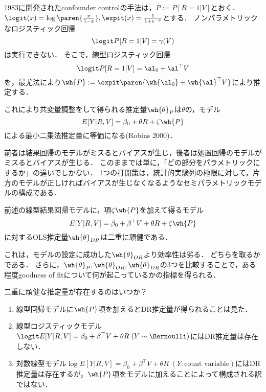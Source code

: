 \documentclass[uplatex,dvipdfmx]{jsreport}
\begin{document}
\begin{example}
    1983に開発されたconfounder controlの手法は，$P:=P[R=1|V]$とおく．
    $\logit (x)=\log\paren{\frac{x}{1-x}},\expit(x)=\frac{1}{1+e^{-x}}$とする．
    ノンパラメトリックなロジスティック回帰
    \[\logit P[R=1|V]=\gamma(V)\]
    は実行できない．
    そこで，線型ロジスティック回帰
    \[\logit P[R=1|V]=\al_0+\al^\top V\]
    を，最尤法により$\wh{P}:=\expit\paren{\wh{\al_0}+\wh{\al}^\top V}$により推定する．

    これにより共変量調整をして得られる推定量$\wh{\theta}_P$は$\theta$の，モデル
    \[E[Y|R,V]=\beta_0+\theta R+\zeta\wh{P}\]
    による最小二乗法推定量に等価になる(Robins 2000)．
\end{example}

\begin{remarks}
    前者は結果回帰のモデルがミスるとバイアスが生じ，後者は処置回帰のモデルがミスるとバイアスが生じる．
このままでは単に，「どの部分をパラメトリックにするか」の違いでしかない．
1つの打開策は，統計的実験列の極限に対して，片方のモデルが正しければバイアスが生じなくなるようなセミパラメトリックモデルの構成である．
\end{remarks}

\begin{example}
    前述の線型結果回帰モデルに，項$\zeta\wh{P}$を加えて得るモデル
    \[E[Y|R,V]=\beta_0+\beta^\top V+\theta R+\zeta\wh{P}\]
    に対するOLS推定量$\wh{\theta}_{DR}$は二重に頑健である．
\end{example}
\begin{remarks}
    これは，モデルの設定に成功した$\wh{\theta}_{OR}$より効率性は劣る．
    どちらを取るかである．
    さらに，$\wh{\theta}_P,\wh{\theta}_{OR},\wh{\theta}_{DR}$の3つを比較することで，ある程度goodness of fitについて何が起こっているかの指標を得られる．
\end{remarks}

\begin{problem}
    二重に頑健な推定量が存在するのはいつか？
    \begin{enumerate}
        \item 線型回帰モデルに$\wh{P}$項を加えるとDR推定量が得られることは見た．
        \item 線型ロジスティックモデル$\logit E[Y|R,V]=\beta_0+\beta^\top V+\theta R\;(Y\sim\Bernoulli)$にはDR推定量は存在しない．
        \item 対数線型モデル$\log E[Y|R,V]=\beta_0+\beta^\top V+\theta R\;(Y:\text{count variable})$にはDR推定量は存在するが，$\wh{P}$項をモデルに加えることによって構成される訳ではない．
    \end{enumerate}
\end{problem}
\end{document}
